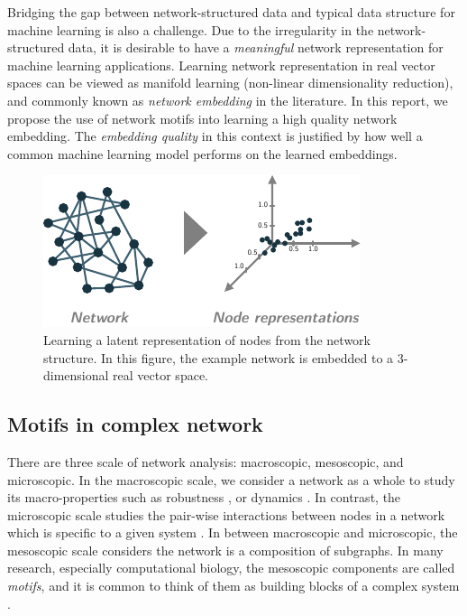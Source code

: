 \documentclass{article}
\theoremstyle{definition}
\begin{document}
Bridging the gap between network-structured data and typical
data structure for machine learning is also a challenge. 
Due to the irregularity in the network-structured data, 
it is desirable to have a \emph{meaningful}
network representation for machine learning applications. 
Learning network representation in real vector spaces can be
viewed as manifold learning (non-linear dimensionality reduction),
and commonly known as \emph{network embedding} in the literature.
In this report, we propose the use of network motifs into learning
a high quality network embedding. The \emph{embedding quality} in this
context is justified by how well a common machine learning model performs 
on the learned embeddings.

\begin{figure} \label{fig:cartoon}
    \centering
    \includegraphics[width=0.8\linewidth]{cartoon_emb}
    \caption{Learning a latent representation of nodes from the network structure. In this figure, the example network is embedded to a 3-dimensional real vector space.}
\end{figure}

\subsection{Motifs in complex network}

There are three scale of network analysis: macroscopic, mesoscopic, 
and microscopic. In the macroscopic scale, we consider a network as a 
whole to study its macro-properties such as robustness 
\cite{callaway2000network}, or dynamics \cite{barabasi2014network}.
In contrast, the microscopic scale studies the pair-wise interactions
between nodes in a network which is specific to a given system 
\cite{physicnet}. In between macroscopic and microscopic, the mesoscopic 
scale considers the network is a composition of subgraphs. 
In many research, especially computational biology, the
mesoscopic components are called \emph{motifs}, and it is common
to think of them as building blocks of a complex system 
\cite{motifblockmilo}.
\end{document}
